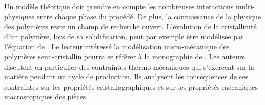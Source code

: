 Un modèle théorique doit prendre en compte les nombreuses interactions multi-physiques entre chaque phase du procédé.
De plus, la connaissance de la physique des polymères reste un champ de recherche ouvert.
L'évolution de la cristallinité d'un polymère, lors de sa solidification, peut par exemple être modélisée par l'équation de \citeauthor{nakamura_aspects_1972} \cite{nakamura_aspects_1972, nakamura_aspects_1973}.
Le lecteur intéressé la modélisation micro-mécanique des polymères semi-cristallin pourra se référer à la monographie de \citeauthor{galeski_nano_2009} \cite{galeski_nano_2009}.
Les auteurs discutent en particulier des contraintes thermo-mécaniques qui s'exercent sur la matière pendant un cycle de production.
Ils analysent les conséquences de ces contraintes sur les propriétés cristallographiques et sur les propriétés mécaniques macroscopiques des pièces.

